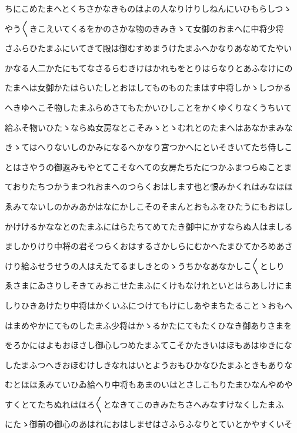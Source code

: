 \documentclass[a4paper,11pt,landscape]{ltjtarticle}
\begin{document}
ちにこめたまへとくちさかなきものはよの人なりけりしねんにいひもらしつゝ
\par\medskip
やう〱きこえいてくるをかのさかな物のきみきゝて女御のおまへに中将少将
\par\medskip
さふらひたまふにいてきて殿は御むすめまうけたまふへかなりあなめてたやい
\par\medskip
かなる人二かたにもてなさるらむきけはかれもをとりはらなりとあふなけにの
\par\medskip
たまへは女御かたはらいたしとおほしてものものたまはす中将しかゝしつかる
\par\medskip
へきゆへこそ物したまふらめさてもたかいひしことをかくゆくりなくうちいて
\par\medskip
給ふそ物いひたゝならぬ女房なとこそみゝとゝむれとのたまへはあなかまみな
\par\medskip
きゝてはへりないしのかみになるへかなり宮つかへにといそきいてたち侍しこ
\par\medskip
とはさやうの御返みもやとてこそなへての女房たちたにつかふまつらぬことま
\par\medskip
ておりたちつかうまつれおまへのつらくおはします也と恨みかくれはみなほほ
\par\medskip
ゑみてないしのかみあかはなにかしこそのそまんとおもふをひたうにもおほし
\par\medskip
かけけるかななとのたまふにはらたちてめてたき御中にかすならぬ人はましる
\par\medskip
ましかりけり中将の君そつらくおはするさかしらにむかへたまひてかろめあさ
\par\medskip
けり給ふせうせうの人はえたてるましきとのゝうちかなあなかしこ〱としり
\par\medskip
ゑさまにゐさりしそきてみおこせたまふにくけもなけれといとはらあしけにま
\par\medskip
しりひきあけたり中将はかくいふにつけてもけにしあやまちたることゝおもへ
\par\medskip
はまめやかにてものしたまふ少将はかゝるかたにてもたくひなき御ありさまを
\par\medskip
をろかにはよもおほさし御心しつめたまふてこそかたきいはほもあはゆきにな
\par\medskip
したまふつへきおほむけしきなれはいとようおもひかなひたまふときもありな
\par\medskip
むとほほゑみていひゐ給へり中将もあまのいはとさしこもりたまひなんやめや
\par\medskip
すくとてたちぬれはほろ〱となきてこのきみたちさへみなすけなくしたまふ
\par\medskip
にたゝ御前の御心のあはれにおはしませはさふらふなりとていとかやすくいそ
\end{document}
